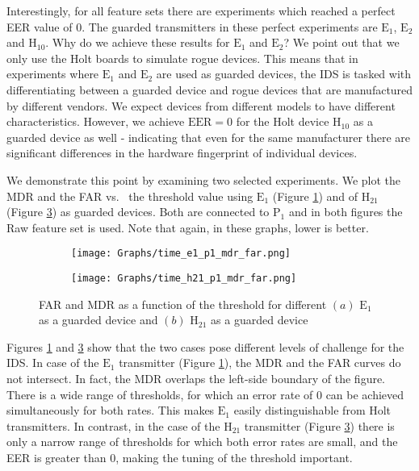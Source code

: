 \documentclass[english]{llncs}
\begin{document}
  Interestingly, for all feature sets there are experiments which reached a perfect EER value of 0. The guarded transmitters in these perfect experiments are \(\text{E}_1\), \(\text{E}_2\) and \(\text{H}_{10}\). Why do we achieve these results for \(\text{E}_1\) and \(\text{E}_2\)? We point out that we only use the Holt boards to simulate rogue devices. This means that in experiments where \(\text{E}_1\) and \(\text{E}_2\) are used as guarded devices, the IDS is tasked with differentiating between a guarded device and rogue devices that are manufactured by different vendors. We expect devices from different models to have different characteristics. However, we achieve \(\text{EER}=0\) for the Holt device \(\text{H}_{10}\) as a guarded device as well - indicating that even for the same manufacturer there are significant differences in the hardware fingerprint of individual devices.
  
  We demonstrate this point by examining two selected experiments. We plot the MDR and the FAR vs.\
  the threshold value using \(\text{E}_1\) (Figure \ref{fig:detection_easy_example}) and of \(\text{H}_{21}\) (Figure \ref{fig:detection_difficult_example}) as guarded devices. Both are connected to \(\text{P}_1\) and in both figures the Raw feature set is used. Note that again, in these graphs, lower is better.
  
  
  \begin{figure}[t]
    \centering
    \begin{subfigure}{0.5\textwidth}
      \centering
      \texttt{[image: Graphs/time\_e1\_p1\_mdr\_far.png]}
      \caption{}
      \label{fig:detection_easy_example}
    \end{subfigure}%
    \begin{subfigure}{0.5\textwidth}
      \centering
      \texttt{[image: Graphs/time\_h21\_p1\_mdr\_far.png]}
      \caption{}
      \label{fig:detection_difficult_example}
    \end{subfigure}
    \caption{FAR and MDR as a function of the threshold for different \((a)\) \(\text{E}_1\)  as a guarded device and \((b)\) \(\text{H}_{21}\) as a guarded device}
  \end{figure}
  
  Figures \ref{fig:detection_easy_example} and \ref{fig:detection_difficult_example} show that the two cases pose different levels of challenge for the IDS.
  In case of the \(\text{E}_1\) transmitter (Figure \ref{fig:detection_easy_example}), the MDR and the FAR curves do not intersect. In fact, the MDR overlaps the left-side boundary of the figure. There is a wide range of thresholds, for which an error rate of 0 can be achieved simultaneously for both rates. This makes \(\text{E}_1\) easily distinguishable from Holt transmitters. In contrast, in the case of the \(\text{H}_{21}\) transmitter (Figure \ref{fig:detection_difficult_example}) there is only a narrow range of thresholds for which both error rates are small, and the EER is greater than 0,
  making the tuning of the threshold important.
  
\end{document}
